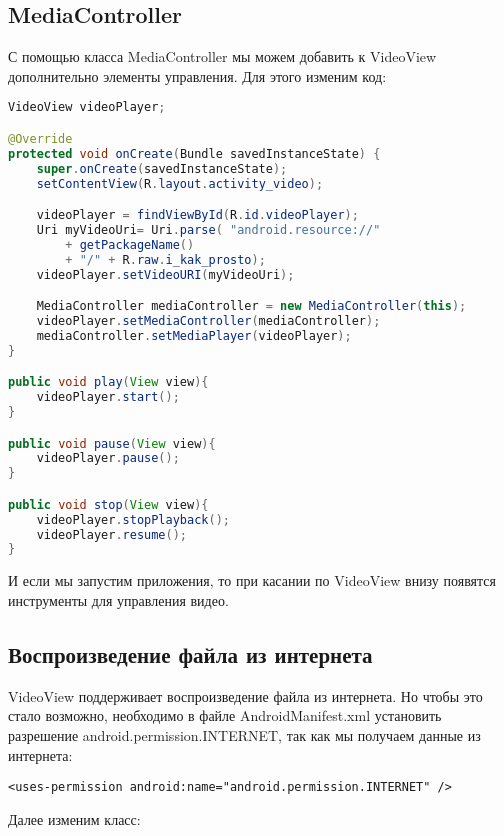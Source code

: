 \subsection{MediaController}
С помощью класса MediaController мы можем добавить к VideoView
дополнительно элементы управления. Для этого изменим код:

\begin{lstlisting}[language=Java
	, label=lst:
	]
VideoView videoPlayer;

@Override
protected void onCreate(Bundle savedInstanceState) {
	super.onCreate(savedInstanceState);
	setContentView(R.layout.activity_video);

	videoPlayer = findViewById(R.id.videoPlayer);
	Uri myVideoUri= Uri.parse( "android.resource://"
		+ getPackageName()
		+ "/" + R.raw.i_kak_prosto);
	videoPlayer.setVideoURI(myVideoUri);

	MediaController mediaController = new MediaController(this);
	videoPlayer.setMediaController(mediaController);
	mediaController.setMediaPlayer(videoPlayer);
}

public void play(View view){
	videoPlayer.start();
}

public void pause(View view){
	videoPlayer.pause();
}

public void stop(View view){
	videoPlayer.stopPlayback();
	videoPlayer.resume();
}
\end{lstlisting}

И если мы запустим приложения, то при касании по VideoView внизу
появятся инструменты для управления видео.

\subsection{Воспроизведение файла из интернета}
VideoView поддерживает воспроизведение файла из интернета. Но чтобы это
стало возможно, необходимо в файле AndroidManifest.xml установить
разрешение android.permission.INTERNET, так как мы получаем данные из
интернета:

\begin{verbatim}
<uses-permission android:name="android.permission.INTERNET" />
\end{verbatim}

Далее изменим класс:

